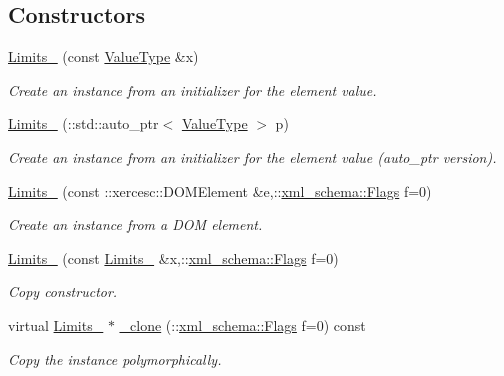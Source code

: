 \subsection*{Constructors}
\begin{DoxyCompactItemize}
\item 
\hyperlink{classopenstack_1_1xml_1_1Limits___af64d32bd9c8697b4612722d81cadefd6}{Limits\_\-} (const \hyperlink{classopenstack_1_1xml_1_1Limits}{ValueType} \&x)
\begin{DoxyCompactList}\small\item\em Create an instance from an initializer for the element value. \item\end{DoxyCompactList}\item 
\hyperlink{classopenstack_1_1xml_1_1Limits___a63651616d368b5e7c079a2e9887ea510}{Limits\_\-} (::std::auto\_\-ptr$<$ \hyperlink{classopenstack_1_1xml_1_1Limits}{ValueType} $>$ p)
\begin{DoxyCompactList}\small\item\em Create an instance from an initializer for the element value (auto\_\-ptr version). \item\end{DoxyCompactList}\item 
\hyperlink{classopenstack_1_1xml_1_1Limits___ad04af74bbfb413b722f66686f5a92b26}{Limits\_\-} (const ::xercesc::DOMElement \&e,::\hyperlink{namespacexml__schema_affb4c227cbd9aa7453dd1dc5a1401943}{xml\_\-schema::Flags} f=0)
\begin{DoxyCompactList}\small\item\em Create an instance from a DOM element. \item\end{DoxyCompactList}\item 
\hyperlink{classopenstack_1_1xml_1_1Limits___a12d95dd4ed3fab518014481bf8c0a6ec}{Limits\_\-} (const \hyperlink{classopenstack_1_1xml_1_1Limits__}{Limits\_\-} \&x,::\hyperlink{namespacexml__schema_affb4c227cbd9aa7453dd1dc5a1401943}{xml\_\-schema::Flags} f=0)
\begin{DoxyCompactList}\small\item\em Copy constructor. \item\end{DoxyCompactList}\item 
virtual \hyperlink{classopenstack_1_1xml_1_1Limits__}{Limits\_\-} $\ast$ \hyperlink{classopenstack_1_1xml_1_1Limits___aaae546235bbf55332421477192b5b28d}{\_\-clone} (::\hyperlink{namespacexml__schema_affb4c227cbd9aa7453dd1dc5a1401943}{xml\_\-schema::Flags} f=0) const 
\begin{DoxyCompactList}\small\item\em Copy the instance polymorphically. \item\end{DoxyCompactList}\end{DoxyCompactItemize}
